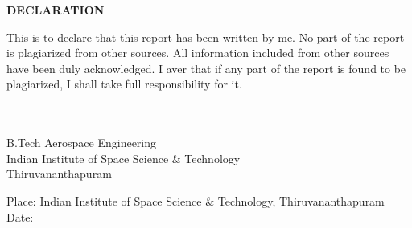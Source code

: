 \newpage
\titlepage{}
\begin{center}
{\LARGE \textbf{\MakeUppercase{Declaration}}\par}
\end{center}
\large
{\Large This is to declare that this report has been written by me. No part of the report is plagiarized from other sources. All information included from other sources have been duly acknowledged. I aver that if any part of the report is found to be plagiarized, I shall take full responsibility for it.\par}
\vfill{}
\begin{flushright}
\nidname{}\\
\nidscode{}\\
B.Tech Aerospace Engineering\\
Indian Institute of Space Science \& Technology\\
Thiruvananthapuram\par
\end{flushright}
\vfill{}
Place: Indian Institute of Space Science \& Technology,
Thiruvananthapuram\\
Date: 
\pagebreak

